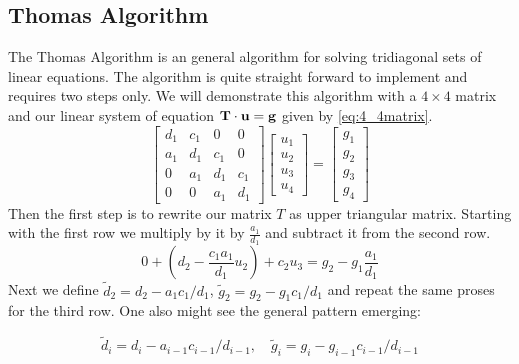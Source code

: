 \subsection*{Thomas Algorithm}

The Thomas Algorithm is an general algorithm for solving tridiagonal sets of
linear equations. The algorithm is quite straight forward to implement and 
requires two steps only.
We will demonstrate this algorithm with a $4 \times 4$ matrix and our linear
system of equation $\mathbf{T} \cdot \mathbf{u} = \mathbf{g}$ given by 
\cref{eq:4_4matrix}.
\begin{equation}\label{eq:4_4matrix}
  \begin{bmatrix}
    d_1 & c_1 & 0 & 0 \\
    a_1 & d_1 & c_1 & 0 \\
    0 & a_1 & d_1 & c_1  \\
    0 & 0 & a_1 & d_1 
  \end{bmatrix} \begin{bmatrix}
    u_1 \\ u_2 \\ u_3 \\ u_4
  \end{bmatrix} = \begin{bmatrix}
    g_1 \\ g_2 \\ g_3 \\ g_4
  \end{bmatrix}
\end{equation} 
Then the first step is to rewrite our matrix $T$ as upper triangular matrix.
Starting with the first row we multiply by it by $\frac{a_1}{d_1}$ and subtract
it from the second row.
\begin{equation*}
  0 + \left(d_2 - \frac{c_1 a_1}{d_1}u_2 \right)+ c_2u_3 = g_2 -g_1 
  \frac{a_1}{d_1}  
\end{equation*}  
Next we define $\tilde{d}_2 = d_2 - a_1 c_1/d_1$, 
$\tilde{g}_2 =  g_2 - g_1 c_1/d_1$ and repeat the same proses for the third row.
One also might see the general pattern emerging:

\begin{equation}
  \tilde{d}_i = d_i- a_{i-1} c_{i-1}/d_{i-1}, \quad \tilde{g}_i =  g_i - g_{i-1} c_{i-1}/d_{i-1}
\end{equation}





